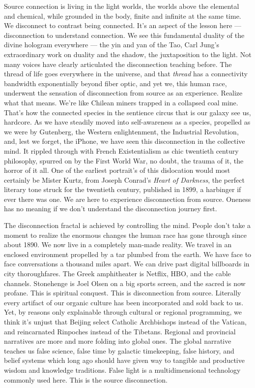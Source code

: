Source connection is living in the light worlds, the worlds above the
elemental and chemical, while grounded in the body, finite and infinite
at the same time. We disconnect to contrast being connected. It's an
aspect of the lesson here --- disconnection to understand connection. We
see this fundamental duality of the divine hologram everywhere --- the
yin and yan of the Tao, Carl Jung's extraordinary work on duality and
the shadow, the juxtaposition to the light. Not many voices have clearly
articulated the disconnection teaching before. The thread of life goes
everywhere in the universe, and that \emph{thread} has a connectivity
bandwidth exponentially beyond fiber optic, and yet we, this human race,
underwent the sensation of disconnection from source as an experience.
Realize what that means. We're like Chilean miners trapped in a
collapsed coal mine. That's how the connected species in the sentience
circus that is our galaxy see us, hardcore. As we have steadily moved
into self-awareness as a species, propelled as we were by Gutenberg, the
Western enlightenment, the Industrial Revolution, and, lest we forget,
the iPhone, we have seen this disconnection in the collective mind. It
rippled through with French Existentialism as chic twentieth century
philosophy, spurred on by the First World War, no doubt, the trauma of
it, the horror of it all. One of the earliest portrait's of this
dislocation would most certainly be Mister Kurtz, from Joseph Conrad's
\emph{Heart of Darkness}, the perfect literary tone struck for the
twentieth century, published in 1899, a harbinger if ever there was one.
We are here to experience disconnection from source. Oneness has no
meaning if we don't understand the disconnection journey first.

The disconnection fractal is achieved by controlling the mind. People
don't take a moment to realize the enormous changes the human race has
gone through since about 1890. We now live in a completely man-made
reality. We travel in an enclosed environment propelled by a tar plumbed
from the earth. We have face to face conversations a thousand miles
apart. We can drive past digital billboards in city thoroughfares. The
Greek amphitheater is Netflix, HBO, and the cable channels. Stonehenge
is Joel Olsen on a big sports screen, and the sacred is now profane.
This is spiritual conquest. This is disconnection from source. Literally
every artifact of our organic culture has been incorporated and sold
back to us. Yet, by reasons only explainable through cultural or
regional programming, we think it's unjust that Beijing select Catholic
Archbishops instead of the Vatican, and reincarnated Rinpoches instead
of the Tibetans. Regional and provincial narratives are more and more
folding into global ones. The global narrative teaches us false science,
false time by galactic timekeeping, false history, and belief systems
which long ago should have given way to tangible and productive wisdom
and knowledge traditions. False light is a multidimensional technology
commonly used here. This is the source disconnection.

